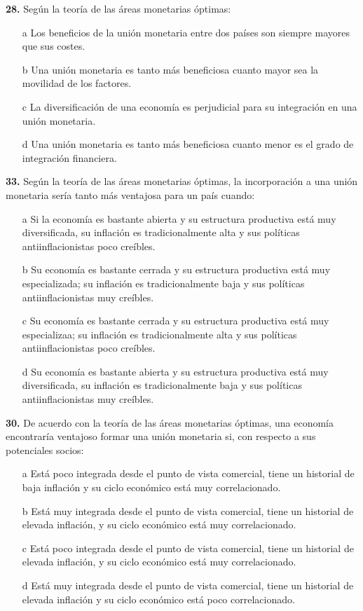 \documentclass{nuevotema}
\begin{document}
\textbf{28.} Según la teoría de las áreas monetarias óptimas:
\begin{itemize}
	\item[a] Los beneficios de la unión monetaria entre dos países son siempre mayores que sus costes.
	\item[b] Una unión monetaria es tanto más beneficiosa cuanto mayor sea la movilidad de los factores.
	\item[c] La diversificación de una economía es perjudicial para su integración en una unión monetaria.
	\item[d] Una unión monetaria es tanto más beneficiosa cuanto menor es el grado de integración financiera.
\end{itemize}

\textbf{33.} Según la teoría de las áreas monetarias óptimas, la incorporación a una unión monetaria sería tanto más ventajosa para un país cuando:
\begin{itemize}
	\item[a] Si la economía es bastante abierta y su estructura productiva está muy diversificada, su inflación es tradicionalmente alta y sus políticas antiinflacionistas poco creíbles.
	\item[b] Su economía es bastante cerrada y su estructura productiva está muy especializada; su inflación es tradicionalmente baja y sus políticas antiinflacionistas muy creíbles.
	\item[c] Su economía es bastante cerrada y su estructura productiva está muy especializaa; su inflación es tradicionalmente alta y sus políticas antiinflacionistas poco creíbles.
	\item[d] Su economía es bastante abierta y su estructura productiva está muy diversificada, su inflación es tradicionalmente baja y sus políticas antiinflacionistas muy creíbles. 
\end{itemize}

\textbf{30.} De acuerdo con la teoría de las áreas monetarias óptimas, una economía encontraría ventajoso formar una unión monetaria si, con respecto a sus potenciales socios:
\begin{itemize}
	\item[a] Está poco integrada desde el punto de vista comercial, tiene un historial de baja inflación y su ciclo económico está muy correlacionado.
	\item[b] Está muy integrada desde el punto de vista comercial, tiene un historial de elevada inflación, y su ciclo económico está muy correlacionado.
	\item[c] Está poco integrada desde el punto de vista comercial, tiene un historial de elevada inflación, y su ciclo económico está muy correlacionado.
	\item[d] Está muy integrada desde el punto de vista comercial, tiene un historial de elevada inflación y su ciclo económico está poco correlacionado.
\end{itemize}
\end{document}
